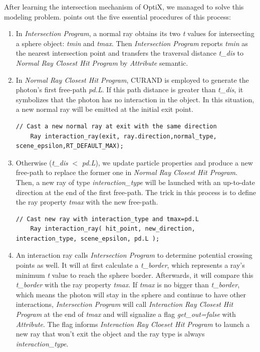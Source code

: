 After learning the intersection mechanism of OptiX, we managed to solve this modeling problem.  points out the five essential procedures of this process:
\begin{enumerate}
  \item{
In \textit{Intersection Program}, a normal ray obtains its two \textit{t} values for intersecting a sphere object: \textit{tmin} and \textit{tmax}. Then \textit{Intersection Program} reports \textit{tmin} as the nearest intersection point and transfers the traversal distance \textit{t\_dis} to \textit{Normal Ray Closest Hit Program} by \textit{Attribute} semantic.
  }
  \item{
In \textit{Normal Ray Closest Hit Program}, CURAND is employed to generate the photon's first free-path \textit{pd.L}. If this path distance is greater than \textit{t\_dis}, it symbolizes that the photon has no interaction in the object. In this situation, a new normal ray will be emitted at the initial exit point.
\begin{lstlisting}[mathescape]
    // Cast a new normal ray at exit with the same direction
    Ray interaction_ray(exit, ray.direction,normal_type, scene_epsilon,RT_DEFAULT_MAX);
\end{lstlisting}
  }
  \item{
Otherwise (\textit{t\_dis} $<$ \textit{pd.L}), we update particle properties and produce a new free-path to replace the former one in \textit{Normal Ray Closest Hit Program}. Then, a new ray of type \textit{interaction\_type} will be launched with an up-to-date direction at the end of the first free-path. The trick in this process is to define the ray property \textit{tmax} with the new free-path.
\begin{lstlisting}[mathescape]
    // Cast new ray with interaction_type and tmax=pd.L
    Ray interaction_ray( hit_point, new_direction, interaction_type, scene_epsilon, pd.L );
\end{lstlisting}
  }
  \item{
An interaction ray calls \textit{Intersection Program} to determine potential crossing points as well. It will at first calculate a \textit{t\_border}, which represents a ray's minimum \textit{t} value to reach the sphere border. Afterwards, it will compare this \textit{t\_border} with the ray property \textit{tmax}. If \textit{tmax} is no bigger than \textit{t\_border}, which means the photon will stay in the sphere and continue to have other interactions, \textit{Intersection Program} will call \textit{Interaction Ray Closest Hit Program} at the end of \textit{tmax} and will signalize a flag \textit{get\_out=false} with \textit{Attribute}. The flag informs \textit{Interaction Ray Cloeset Hit Program} to launch a new ray that won't exit the object and the ray type is always \textit{interaction\_type}.
}
\end{enumerate}
